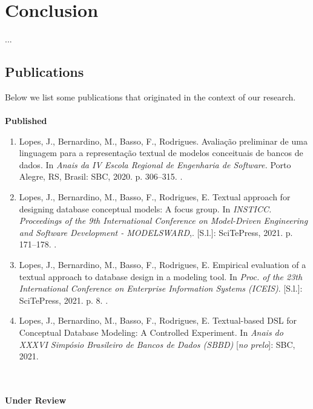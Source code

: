 \chapter{Conclusion}
\label{chap:conclusion}

...

\section{Publications}
Below we list some publications that originated in the context of our research.
\\~\\
\textbf{Published} 
    \begin{enumerate}[label=\roman*.]
        \item Lopes, J., Bernardino, M., Basso, F., Rodrigues. Avaliação preliminar de uma linguagem para a representação textual de modelos conceituais de bancos de dados. In \textit{Anais da IV Escola Regional de Engenharia de Software.} Porto Alegre, RS, Brasil: SBC, 2020. p. 306–315. \cite{eres}.
        \item Lopes, J., Bernardino, M., Basso, F., Rodrigues, E. Textual approach for designing database conceptual models: A focus group. In \textit{INSTICC. Proceedings of the 9th International Conference on Model-Driven Engineering and Software Development - MODELSWARD},. [S.l.]: SciTePress, 2021. p. 171–178. \cite{modelsward21}.
        \item Lopes, J., Bernardino, M., Basso, F., Rodrigues, E. Empirical evaluation of a textual approach to database design in a modeling tool. In \textit{Proc. of the 23th International Conference on Enterprise Information Systems (ICEIS)}. [S.l.]: SciTePress, 2021. p. 8. 
        \cite{iceis21}.
        \item Lopes, J., Bernardino, M., Basso, F., Rodrigues, E. Textual-based DSL for Conceptual Database Modeling: A Controlled Experiment. In \textit{Anais do XXXVI Simpósio Brasileiro de Bancos de Dados (SBBD)} [\textit{no prelo}]: SBC, 2021. 
    \end{enumerate} 

\\~\\

\textbf{Under Review}  

